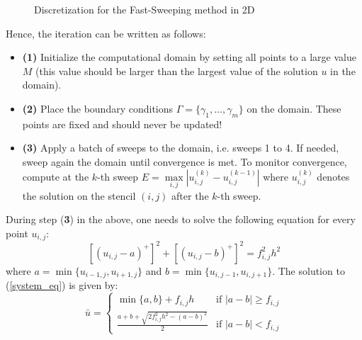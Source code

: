 \documentclass[11pt]{article}
\theoremstyle{definition}
\theoremstyle{remark}
\begin{document}
\begin{figure}[h!]
    \centering
    \caption{Discretization for the Fast-Sweeping method in 2D}
    \label{fig:graph_discretization}
\end{figure}

Hence, the iteration can be written as follows:
\begin{itemize}
    \item \textbf{(1)} Initialize the computational domain by setting all points to a large value $M$ (this value should be larger than the largest value of the solution $u$ in the domain).
    \item \textbf{(2)} Place the boundary conditions $\Gamma=\{\gamma_1,\dots,\gamma_m\}$ on the domain. These points are fixed and should never be updated!
    \item \textbf{(3)} Apply a batch of sweeps to the domain, i.e. sweeps 1 to 4. If needed, sweep again the domain until convergence is met. To monitor convergence, compute at the $k$-th sweep $E = \max\limits_{i,j} \left| u_{i,j}^{(k)} - u_{i,j}^{(k-1)} \right|$ where $u_ {i,j}^{(k)}$ denotes the solution on the stencil $(i,j)$ after the $k$-th sweep.
\end{itemize}
\noindent During step (\textbf{3}) in the above, one needs to solve the following equation for every point $u_{i,j}$:
\begin{equation}
\label{system_eq}
    [(u_{i,j}-a)^{+}]^2+[(u_{i,j}-b)^{+}]^2=f_{i,j}^2h^2
\end{equation}
\noindent where $a=\min\{u_{i-1,j},u_{i+1,j}\}$ and $b=\min\{u_{i,j-1},u_{i,j+1}\}$. The solution to (\ref{system_eq}) is given by:
\begin{equation*}
    \bar{u}=\begin{cases}
        \min\{a,b\}+f_{i,j}h & \text {if }|a-b|\geq f_{i,j} \\
        \frac{a+b+\sqrt{2f_{i,j}^2h^2-(a-b)^2}}{2} & \text {if }|a-b|< f_{i,j}
    \end{cases}
\end{equation*}
\end{document}
